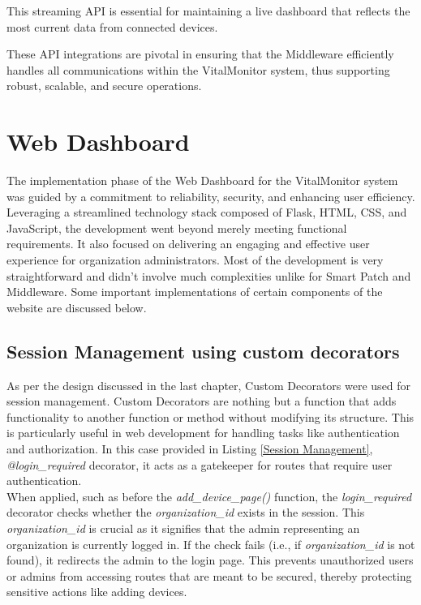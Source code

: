\noindent This streaming API is essential for maintaining a live dashboard that reflects the most current data from connected devices.

\noindent These API integrations are pivotal in ensuring that the Middleware efficiently handles all communications within the VitalMonitor system, thus supporting robust, scalable, and secure operations.


\section{Web Dashboard}
The implementation phase of the Web Dashboard for the VitalMonitor system was guided by a commitment to reliability, security, and enhancing user efficiency. Leveraging a streamlined technology stack composed of Flask, HTML, CSS, and JavaScript, the development went beyond merely meeting functional requirements. It also focused on delivering an engaging and effective user experience for organization administrators. Most of the development is very straightforward and didn't involve much complexities unlike for Smart Patch and Middleware. Some important implementations of certain components of the website are discussed below.

\subsection{Session Management using custom decorators}

As per the design discussed in the last chapter, Custom Decorators were used for session management. Custom Decorators are nothing but a function that adds functionality to another function or method without modifying its structure. This is particularly useful in web development for handling tasks like authentication and authorization. In this case provided in Listing \ref{Session Management}, \textit{@login\_required} decorator, it acts as a gatekeeper for routes that require user authentication. \\ 

When applied, such as before the \textit{add\_device\_page()} function, the \textit{login\_required} decorator checks whether the \textit{organization\_id} exists in the session. This \textit{organization\_id} is crucial as it signifies that the admin representing an organization is currently logged in. If the check fails (i.e., if \textit{organization\_id} is not found), it redirects the admin to the login page. This prevents unauthorized users or admins from accessing routes that are meant to be secured, thereby protecting sensitive actions like adding devices.

